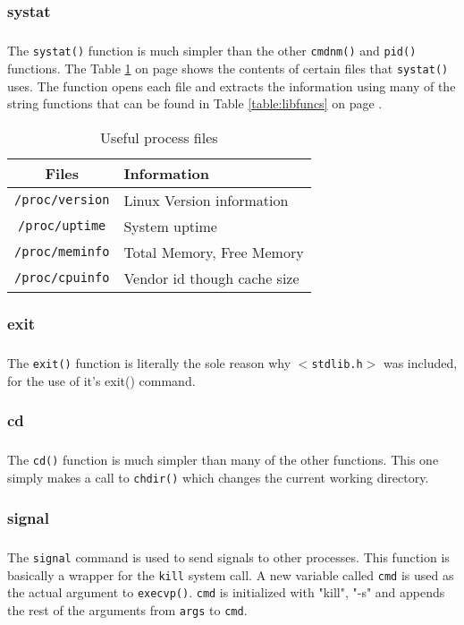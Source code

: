 \documentclass[10pt]{article}
\begin{document}
\subsubsection{systat}
\subparagraph{}
The \texttt{systat()} function is much simpler than the other \texttt{cmdnm()} and \texttt{pid()} functions. The Table \ref{table:procFiles} on page \pageref{table:procFiles} shows the contents of certain files that \texttt{systat()} uses. The function opens each file and extracts the information using many of the string functions that can be found in Table \ref{table:libfuncs} on page \pageref{table:libfuncs}.


\begin{table}[b]
\centering
\begin{tabular}{c|l}
	Files & Information\\\hline\hline
	\texttt{/proc/version} & Linux Version information\\
	\texttt{/proc/uptime} & System uptime\\
	\texttt{/proc/meminfo} & Total Memory, Free Memory\\
	\texttt{/proc/cpuinfo} & Vendor id though cache size\\
\end{tabular}
\vspace{2mm}
\caption{Useful process files}
\label{table:procFiles}
\end{table}


\subsubsection{exit}
\subparagraph{}
The \texttt{exit()} function is literally the sole reason why \texttt{$<$stdlib.h$>$} was included, for the use of it's exit() command.


\subsubsection{cd}
\subparagraph{}
The \texttt{cd()} function is much simpler than many of the other functions. This one simply makes a call to \texttt{chdir()} which changes the current working directory. 

\newpage

\subsubsection{signal}
\subparagraph{}
The \texttt{signal} command is used to send signals to other processes. This function is basically a wrapper for the \texttt{kill} system call. A new variable called \texttt{cmd} is used as the actual argument to \texttt{execvp()}. \texttt{cmd} is initialized with {"kill", "-s"} and appends the rest of the arguments from \texttt{args} to \texttt{cmd}.
\end{document}
